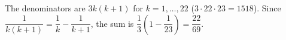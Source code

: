 The denominators are $3k(k+1)$ for $k=1,\dots,22$ ($3\cdot22\cdot23=1518$). Since $\dfrac1{k(k+1)}=\dfrac1k-\dfrac1{k+1}$, the sum is $\dfrac13\left(1-\dfrac1{23}\right)=\boxed{\dfrac{22}{69}}$.
